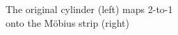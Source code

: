 \documentclass[preview]{standalone}
\begin{document}
\begin{center}
The original cylinder (left) maps 2-to-1\\onto the Möbius strip (right)
\end{center}
\end{document}
